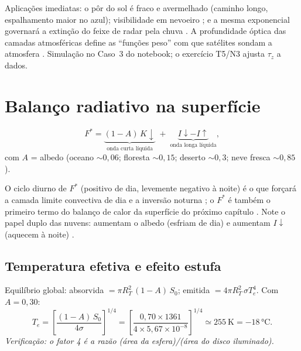 \documentclass[11pt]{article}
\begin{document}
Aplicações imediatas: o pôr do sol é fraco e avermelhado (caminho longo,
espalhamento maior no azul); visibilidade em nevoeiro
; e a mesma exponencial governará a extinção
do feixe de radar pela chuva . A
profundidade óptica das camadas atmosféricas define as ``funções peso''
com que satélites sondam a atmosfera .
Simulação no Caso~3 do notebook; o exercício T5/N3 ajusta $\tau_z$ a
dados.

\section{Balanço radiativo na superfície}\label{sec:balanco}


\begin{formalivro}
\[ F^{*} = \underbrace{(1-A)\,K\!\downarrow}_{\text{onda curta líquida}}
 \;+\; \underbrace{I\!\downarrow - I\!\uparrow}_{\text{onda longa líquida}}, \]
com $A$ = albedo (oceano $\sim0{,}06$; floresta $\sim0{,}15$; deserto
$\sim0{,}3$; neve fresca $\sim0{,}85$).
\end{formalivro}

O ciclo diurno de $F^*$ (positivo de dia, levemente negativo à noite) é o
que forçará a camada limite convectiva de dia e a inversão noturna
; o $F^*$ é também o primeiro
termo do balanço de calor da superfície do próximo capítulo
. Note o
papel duplo das nuvens: aumentam o albedo (esfriam de dia) e aumentam
$I\!\downarrow$ (aquecem à noite) .

\subsection{Temperatura efetiva e efeito estufa}


\begin{exemplo}
Equilíbrio global: absorvida $= \pi R_T^2\,(1-A)\,S_0$; emitida
$= 4\pi R_T^2\,\sigma T_e^4$. Com $A = 0{,}30$:
\[ T_e = \left[\frac{(1-A)\,S_0}{4\sigma}\right]^{1/4}
 = \left[\frac{0{,}70\times1361}{4\times5{,}67\times10^{-8}}\right]^{1/4}
 \simeq 255\ \mathrm{K} = -18\,°\mathrm{C}. \]
\emph{Verificação: o fator 4 é a razão (área da esfera)/(área do disco
iluminado).}
\end{exemplo}
\end{document}
